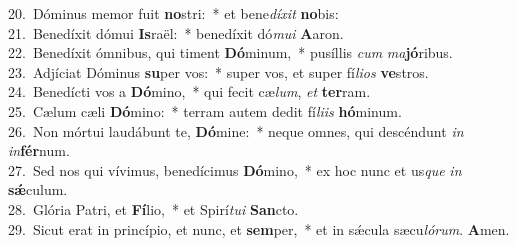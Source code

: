 {20.~}Dóminus memor fuit \textbf{no}stri:~* et bene\textit{dí}\textit{xit} \textbf{no}bis:\\
{21.~}Benedíxit dómui \textbf{Is}raël:~* benedíxit dó\textit{mu}\textit{i} \textbf{A}aron.\\
{22.~}Benedíxit ómnibus, qui timent \textbf{Dó}minum,~* pusíllis \textit{cum} \textit{ma}\textbf{jó}ribus.\\
{23.~}Adjíciat Dóminus \textbf{su}per vos:~* super vos, et super fí\textit{li}\textit{os} \textbf{ve}stros.\\
{24.~}Benedícti vos a \textbf{Dó}mino,~* qui fecit cæ\textit{lum}, \textit{et} \textbf{ter}ram.\\
{25.~}Cælum cæli \textbf{Dó}mino:~* terram autem dedit fí\textit{li}\textit{is} \textbf{hó}minum.\\
{26.~}Non mórtui laudábunt te, \textbf{Dó}mine:~* neque omnes, qui descéndunt \textit{in} \textit{in}\textbf{fér}num.\\
{27.~}Sed nos qui vívimus, benedícimus \textbf{Dó}mino,~* ex hoc nunc et us\textit{que} \textit{in} \textbf{sǽ}culum.\\
{28.~}Glória Patri, et \textbf{Fí}lio,~* et Spirí\textit{tu}\textit{i} \textbf{San}cto.\\
{29.~}Sicut erat in princípio, et nunc, et \textbf{sem}per,~* et in sǽcula sæcu\textit{ló}\textit{rum}. \textbf{A}men.\\
